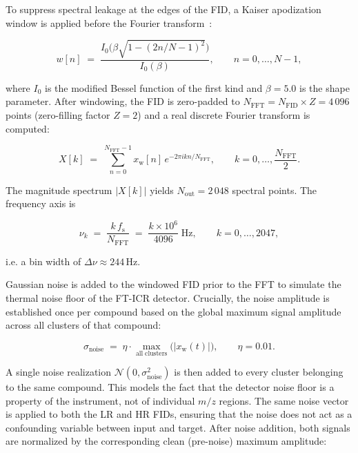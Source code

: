\documentclass[12pt,a4paper]{report}
\begin{document}
To suppress spectral leakage at the edges of the FID, a Kaiser apodization
window is applied before the Fourier transform~\cite{kaiser1966,harris1978}:

\begin{equation}
  w[n] \;=\; \frac{I_0\!\bigl(\beta\sqrt{1-(2n/N-1)^2}\bigr)}
  {I_0(\beta)}, \qquad
  n = 0,\dots,N-1,
  \label{eq:kaiser_window}
\end{equation}

where $I_0$ is the modified Bessel function of the first kind and $\beta = 5.0$
is the shape parameter.  After windowing, the FID is zero-padded to
$N_{\mathrm{FFT}} = N_{\mathrm{FID}} \times Z = 4\,096$ points (zero-filling
factor $Z = 2$) and a real discrete Fourier transform is computed:

\begin{equation}
  X[k] \;=\; \sum_{n=0}^{N_{\mathrm{FFT}}-1}
  x_{\mathrm{w}}[n]\,e^{-2\pi i kn/N_{\mathrm{FFT}}},
  \qquad
  k = 0,\dots,\frac{N_{\mathrm{FFT}}}{2}.
  \label{eq:fft}
\end{equation}

The magnitude spectrum $|X[k]|$ yields $N_{\mathrm{out}} = 2\,048$ spectral
points.  The frequency axis is

\begin{equation}
  \nu_k \;=\; \frac{k\,f_{\mathrm{s}}}{N_{\mathrm{FFT}}}
  \;=\; \frac{k \times 10^{6}}{4096}\;\mathrm{Hz},
  \qquad k = 0,\dots,2047,
\end{equation}

i.e. a bin width of $\Delta\nu \approx 244\,$Hz.

Gaussian noise is added to the windowed FID prior to the FFT to simulate the
thermal noise floor of the FT-ICR detector.  Crucially, the noise amplitude is
established once per compound based on the global maximum signal amplitude across
all clusters of that compound:

\begin{equation}
  \sigma_{\mathrm{noise}} \;=\; \eta \cdot
  \max_{\mathrm{all\;clusters}}\!\bigl(|x_{\mathrm{w}}(t)|\bigr),
  \qquad
  \eta = 0.01.
  \label{eq:noise_level}
\end{equation}

A single noise realization $\mathcal{N}(0,\sigma_{\mathrm{noise}}^2)$ is then
added to every cluster belonging to the same compound.  This models the fact
that the detector noise floor is a property of the instrument, not of
individual $m/z$ regions.  The same noise vector is applied to both the LR and
HR FIDs, ensuring that the noise does not act as a confounding variable between
input and target.  After noise addition, both signals are normalized by the
corresponding clean (pre-noise) maximum amplitude:
\end{document}
